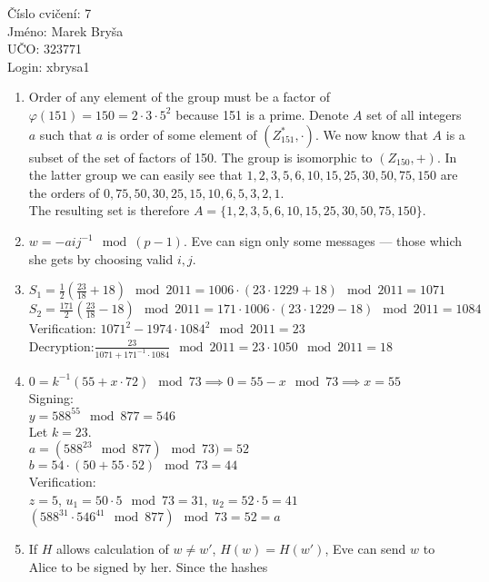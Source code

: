 \documentclass[a4paper,10pt]{extarticle}
\begin{document}
\begin{flushleft}
Číslo cvičení: 7 \\ 
Jméno: Marek Bryša \\
UČO: 323771\\
Login: xbrysa1\\
\end{flushleft}
\begin{enumerate}
  \item
  Order of any element of the group must be a factor of $\varphi(151)=150=2\cdot3\cdot5^2$ because 151 is a prime.
  Denote $A$ set of all integers $a$ such that $a$ is order of some element of $(Z^*_{151},\cdot)$. We now know that $A$ is
  a subset of the set of factors of 150. The group is isomorphic to $(Z_{150},+)$. In the latter group we can easily see that
  $1, 2, 3, 5, 6, 10, 15, 25, 30, 50, 75, 150$ are the orders of $0, 75, 50, 30, 25, 15, 10, 6, 5, 3, 2, 1$.\\
  The resulting set is therefore $A=\{1,2,3,5,6,10,15,25,30,50,75,150\}$.
  \item
    $w=-aij^{-1} \mod (p-1)$. Eve can sign only some messages --- those which she gets by choosing valid $i,j$.
  \item
    $S_1=\frac{1}{2}(\frac{23}{18}+18) \mod 2011=1006\cdot(23\cdot1229+18) \mod 2011=1071$\\
    $S_2=\frac{171}{2}(\frac{23}{18}-18) \mod 2011=171\cdot1006\cdot(23\cdot1229 -18) \mod 2011=1084$\\
    Verification: $1071^2-1974\cdot1084^2 \mod 2011=23$\\
    Decryption:$\frac{23}{1071+171^{-1}\cdot1084} \mod 2011=23\cdot1050 \mod 2011=18$
  \item
    $0=k^{-1}(55+x\cdot72) \mod 73\implies 0=55-x \mod 73 \implies x=55$\\
    Signing:\\
    $y=588^{55} \mod 877 = 546$\\
    Let $k=23$.\\
    $a=(588^{23} \mod 877) \mod 73)=52$\\
    $b=54\cdot(50+55\cdot52)\mod 73=44$\\
    Verification:\\
    $z=5$, $u_1=50\cdot5 \mod 73 =31$, $u_2=52\cdot5=41$\\
    $(588^{31}\cdot546^{41} \mod 877) \mod 73=52=a$
  \item
    If $H$ allows calculation of $w\neq w'$, $H(w)=H(w')$, Eve can send $w$ to Alice to be signed by her. Since the hashes

\end{enumerate}
\end{document}
